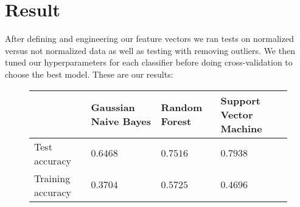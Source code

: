 \section{Result}

After defining and engineering our feature vectors we ran tests on normalized versus not normalized data as well as testing with removing outliers. We then tuned our hyperparameters for each classifier before doing cross-validation to choose the best model. These are our results:
\begin{figure}[!ht]
    \centering
    \begin{tabular}{|l|l|l|l|}
        \hline
        \rowcolor{gray!50}
        & Gaussian Naive Bayes & Random Forest & Support Vector Machine \\ \hline
        Test accuracy & $0.6468$ & $0.7516$ & $0.7938$ \\ \hline
        Training accuracy & $0.3704$ & $0.5725$ & $0.4696$ \\ \hline
    \end{tabular}
\end{figure}

